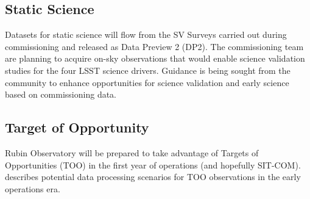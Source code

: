 \subsection{Static Science}
 
Datasets for static science will flow from the SV Surveys carried out during commissioning and released as Data Preview 2 (DP2). 
The commissioning team are planning to acquire on-sky observations that would enable science validation studies for the four LSST science drivers.
Guidance is being sought from the community to enhance opportunities for science validation and early science  based on commissioning data.

\subsection{Target of Opportunity}

Rubin Observatory will be prepared to take advantage of Targets of Opportunities (TOO) in the first year of operations (and hopefully SIT-COM). 
 describes potential data processing scenarios for TOO observations in the early operations era.